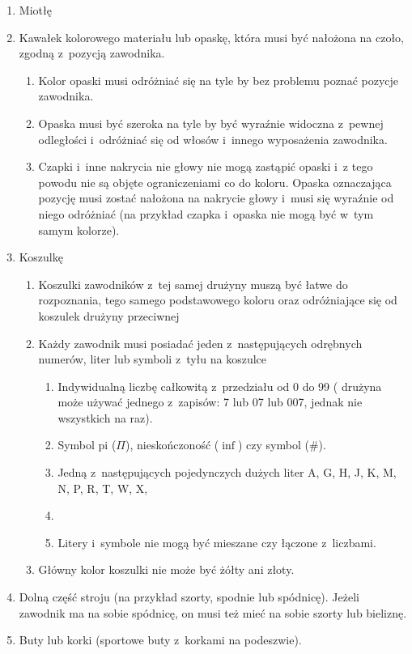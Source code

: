 \documentclass[12pt]{article}
\begin{document}
\begin{enumerate}
	\item
	      Miotłę
	\item
	      Kawałek kolorowego materiału lub opaskę, która musi być nałożona na
	      czoło, zgodną z~pozycją zawodnika.

	      \begin{enumerate}
		      \item
		            Kolor opaski musi odróżniać się na tyle by bez problemu poznać
		            pozycje zawodnika.
		      \item
		            Opaska musi być szeroka na tyle by być wyraźnie widoczna z~pewnej
		            odległości i~odróżniać się od włosów i~innego wyposażenia zawodnika.
		      \item
		            Czapki i~inne nakrycia nie głowy nie mogą zastąpić opaski i~z tego
		            powodu nie są objęte ograniczeniami co do koloru. Opaska oznaczająca
		            pozycję musi zostać nałożona na nakrycie głowy i~musi się wyraźnie
		            od niego odróżniać (na przykład czapka i~opaska nie mogą być w~tym
		            samym kolorze).
	      \end{enumerate}
	\item
	      Koszulkę

	      \begin{enumerate}
		      \item
		            Koszulki zawodników z~tej samej drużyny muszą być łatwe do
		            rozpoznania, tego samego podstawowego koloru oraz odróżniające się
		            od koszulek drużyny przeciwnej
		      \item
		            Każdy zawodnik musi posiadać jeden z~następujących odrębnych
		            numerów, liter lub symboli z~tyłu na koszulce

		            \begin{enumerate}
			            \item
			                  Indywidualną liczbę całkowitą z~przedziału od 0 do 99 ( drużyna
			                  może używać jednego z~zapisów: 7 lub 07 lub 007, jednak nie
			                  wszystkich na raz).
			            \item
			                  Symbol pi ($\Pi$), nieskończoność ($\inf$) czy symbol (\#).
			            \item
			                  Jedną z~następujących pojedynczych dużych liter A, G, H, J, K, M,
			                  N, P, R, T, W, X, \item
			            \item
			                  Litery i~symbole nie mogą być mieszane czy łączone z~liczbami.
		            \end{enumerate}
		      \item
		            Główny kolor koszulki nie może być żółty ani złoty.
	      \end{enumerate}
	\item
	      Dolną część stroju (na przykład szorty, spodnie lub spódnicę). Jeżeli
	      zawodnik ma na sobie spódnicę, on musi też mieć na sobie szorty lub
	      bieliznę.
	\item
	      Buty lub korki (sportowe buty z~korkami na podeszwie).


\end{enumerate}
\end{document}
